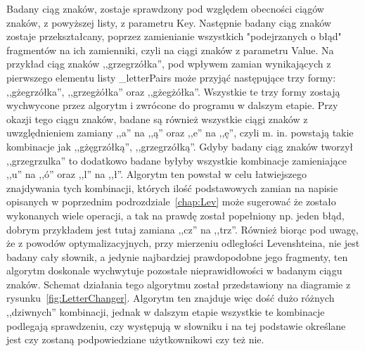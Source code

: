 \lssetdef


Badany ciąg znaków, zostaje sprawdzony pod względem obecności ciągów znaków, z powyższej listy, z parametru Key. Następnie badany ciąg znaków zostaje przekształcany, poprzez zamienianie wszystkich "podejrzanych o błąd" fragmentów na ich zamienniki, czyli na ciągi znaków z parametru Value. Na przykład ciąg znaków ,,grzegrzółka'', pod wpływem zamian wynikających z pierwszego elementu listy \_letterPairs może przyjąć następujące trzy formy: ,,gżegrzółka'', ,,grzegżółka'' oraz ,,gżegżółka''. Wszystkie te trzy formy zostają wychwycone przez algorytm i zwrócone do programu w dalszym etapie. Przy okazji tego ciągu znaków, badane są również wszystkie ciągi znaków z uwzględnieniem zamiany ,,a'' na ,,ą'' oraz ,,e'' na ,,ę'', czyli m. in. powstają takie kombinacje jak ,,gżęgrzółką'', ,,grzegrzółką''.  Gdyby badany ciąg znaków tworzył ,,grzegrzulka'' to dodatkowo badane byłyby wszystkie kombinacje zamieniające ,,u'' na ,,ó'' oraz ,,l'' na ,,ł''. Algorytm ten powstał w celu łatwiejszego znajdywania tych kombinacji, których ilość podstawowych zamian na napisie opisanych w poprzednim podrozdziale~\ref{chap:Lev} może sugerować że zostało wykonanych wiele operacji, a tak na prawdę został popełniony np. jeden błąd, dobrym przykładem jest tutaj zamiana ,,cz'' na ,,trz''. Również biorąc pod uwagę, że z powodów optymalizacyjnych, przy mierzeniu odległości Levenshteina, nie jest badany cały słownik, a jedynie najbardziej prawdopodobne jego fragmenty, ten algorytm doskonale wychwytuje pozostałe nieprawidłowości w badanym ciągu znaków. Schemat działania tego algorytmu został przedstawiony na diagramie z rysunku~\ref{fig:LetterChanger}. Algorytm ten znajduje więc dość dużo różnych ,,dziwnych'' kombinacji, jednak w dalszym etapie wszystkie te kombinacje podlegają sprawdzeniu, czy występują w słowniku i na tej podstawie określane jest czy zostaną podpowiedziane użytkownikowi czy też nie.

